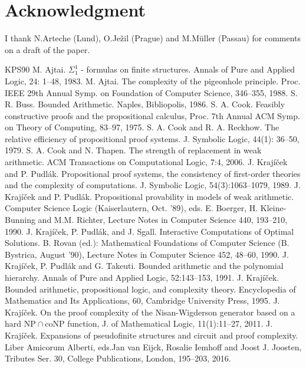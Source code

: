 \documentclass[11pt]{article}
\newcommand{\NP}{\mathrm{NP}}
\newcommand{\coNP}{\mathrm{coNP}}
\begin{document}
\section*{Acknowledgment}
I thank N.Arteche (Lund), O.Ježil (Prague) and M.Müller (Passau) for comments on a draft of the paper.
\begin{thebibliography}{KPS90}
 M. Ajtai. $\Sigma^1_1$ - formulas on finite structures. Annals of Pure and Applied Logic, 24: 1--48, 1983.
 M. Ajtai. The complexity of the pigeonhole principle. Proc. IEEE 29th Annual Symp. on Foundation of Computer Science, 346--355, 1988.
 S. R. Buss. Bounded Arithmetic. Naples, Bibliopolis, 1986.
 S. A. Cook. Feasibly constructive proofs and the propositional calculus, Proc. 7th Annual ACM Symp. on Theory of Computing, 83--97, 1975.
 S. A. Cook and R. A. Reckhow. The relative efficiency of propositional proof systems. J. Symbolic Logic, 44(1): 36--50, 1979.
 S. A. Cook and N. Thapen. The strength of replacement in weak arithmetic. ACM Transactions on Computational Logic, 7:4, 2006.
 J. Krajíček and P. Pudlák. Propositional proof systems, the consistency of first-order theories and the complexity of computations. J. Symbolic Logic, 54(3):1063--1079, 1989.
 J. Krajíček and P. Pudlák. Propositional provability in models of weak arithmetic. Computer Science Logic (Kaiserlautern, Oct. '89), eds. E. Boerger, H. Kleine-Bunning and M.M. Richter, Lecture Notes in Computer Science 440, 193--210, 1990.
 J. Krajíček, P. Pudlák, and J. Sgall. Interactive Computations of Optimal Solutions. B. Rovan (ed.): Mathematical Foundations of Computer Science (B. Bystrica, August '90), Lecture Notes in Computer Science 452, 48--60, 1990.
 J. Krajíček, P. Pudlák and G. Takeuti. Bounded arithmetic and the polynomial hierarchy. Annals of Pure and Applied Logic, 52:143--153, 1991.
 J. Krajíček. Bounded arithmetic, propositional logic, and complexity theory. Encyclopedia of Mathematics and Its Applications, 60, Cambridge University Press, 1995.
 J. Krajíček. On the proof complexity of the Nisan-Wigderson generator based on a hard $\NP\cap\coNP$ function, J. of Mathematical Logic, 11(1):11--27, 2011.
 J. Krajíček. Expansions of pseudofinite structures and circuit and proof complexity. Liber Amicorum Alberti, eds.Jan van Eijck, Rosalie Iemhoff and Joost J. Joosten, Tributes Ser. 30, College Publications, London, 195--203, 2016.

\end{thebibliography}
\end{document}
